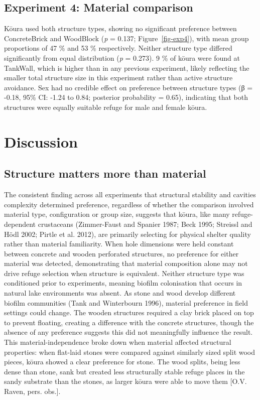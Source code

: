 \documentclass[
  12pt,
  a4paper,
]{scrbook}
\begin{document}
\section{Experiment 4: Material
comparison}\label{experiment-4-material-comparison-1}

Kōura used both structure types, showing no significant preference
between ConcreteBrick and WoodBlock (\emph{p} = 0.137;
Figure~\ref{fig-exp4}), with mean group proportions of 47 \% and 53 \%
respectively. Neither structure type differed significantly from equal
distribution (\emph{p} = 0.273). 9 \% of kōura were found at TankWall,
which is higher than in any previous experiment, likely reflecting the
smaller total structure size in this experiment rather than active
structure avoidance. Sex had no credible effect on preference between
structure types (β = -0.18, 95\% CI: -1.24 to 0.84; posterior
probability = 0.65), indicating that both structures were equally
suitable refuge for male and female kōura.


\chapter{Discussion}\label{discussion-2}

\section{Structure matters more than
material}\label{structure-matters-more-than-material}

The consistent finding across all experiments that structural stability
and cavities complexity determined preference, regardless of whether the
comparison involved material type, configuration or group size, suggests
that kōura, like many refuge-dependent crustaceans (Zimmer-Faust and
Spanier 1987; Beck 1995; Streissl and Hödl 2002; Pirtle et al. 2012),
are primarily selecting for physical shelter quality rather than
material familiarity. When hole dimensions were held constant between
concrete and wooden perforated structures, no preference for either
material was detected, demonstrating that material composition alone may
not drive refuge selection when structure is equivalent. Neither
structure type was conditioned prior to experiments, meaning biofilm
colonisation that occurs in natural lake environments was absent. As
stone and wood develop different biofilm communities (Tank and
Winterbourn 1996), material preference in field settings could change.
The wooden structures required a clay brick placed on top to prevent
floating, creating a difference with the concrete structures, though the
absence of any preference suggests this did not meaningfully influence
the result. This material-independence broke down when material affected
structural properties: when flat-laid stones were compared against
similarly sized split wood pieces, kōura showed a clear preference for
stone. The wood splits, being less dense than stone, sank but created
less structurally stable refuge places in the sandy substrate than the
stones, as larger kōura were able to move them {[}O.V. Raven, pers.
obs.{]}.
\end{document}
